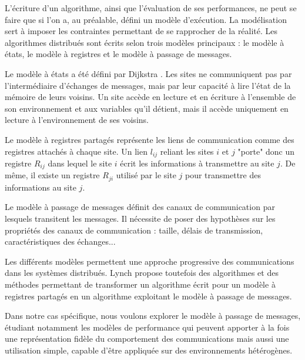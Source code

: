 L'écriture d'un algorithme, ainsi que l'évaluation de ses
performances, ne peut se faire que si l'on a, au préalable, défini un
modèle d'exécution. La modélisation sert à imposer les contraintes
permettant de se rapprocher de la réalité. Les algorithmes distribués
sont écrits selon trois modèles principaux : le modèle à états, le
modèle à registres et le modèle à passage de messages.

Le modèle à états a été défini par Dijkstra \cite{Dij74}. Les sites ne
communiquent pas par l'intermédiaire d'échanges de messages, mais par
leur capacité à lire l'état de la mémoire de leurs voisins. Un site
accède en lecture et en écriture à l'ensemble de son environnement et
aux variables qu'il détient, mais il accède uniquement en lecture à
l'environnement de ses voisins.

Le modèle à registres partagés représente les liens de communication
comme des registres attachés à chaque site. Un lien $l_{ij}$ reliant
les sites $i$ et $j$ "porte" donc un registre $R_{ij}$ dans lequel
le site $i$ écrit les informations à transmettre au site $j$. De même,
il existe un registre $R_{ji}$ utilisé par le site $j$ pour
transmettre des informations au site $j$.

Le modèle à passage de messages définit des canaux de communication
par lesquels transitent les messages. Il nécessite de poser des
hypothèses sur les propriétés des canaux de communication : taille,
délais de transmission, caractéristiques des échanges...

Les différents modèles permettent une approche progressive des
communications dans les systèmes distribués. Lynch \cite{Lyn96}
propose toutefois des algorithmes et des méthodes permettant de
transformer un algorithme écrit pour un modèle à registres partagés en
un algorithme exploitant le modèle à passage de messages.

Dans notre cas spécifique, nous voulons explorer le modèle à passage de messages,
étudiant notamment les modèles de performance qui peuvent apporter à la fois une
représentation fidèle du comportement des communications mais aussi une 
utilisation simple, capable d'être appliquée sur des environnements hétérogènes.

